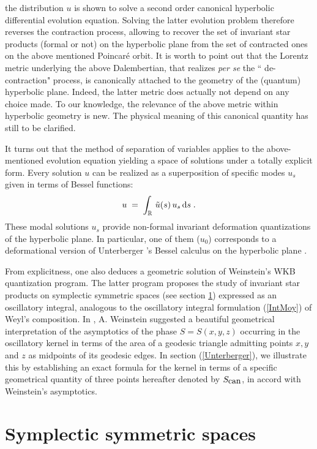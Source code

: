 \documentclass{article}
\newcommand{\R}{\mathbb R}
\def \R{{\mathbb R}}
\begin{document}
the distribution $u$ is shown to solve a second order canonical hyperbolic differential evolution equation.  Solving the latter evolution problem therefore reverses the contraction process, allowing to recover
the set of invariant star products (formal or not) on the hyperbolic plane from the set of contracted ones on the 
above mentioned Poincar\'e orbit. It is worth to point out that the Lorentz metric underlying the above Dalembertian,
that realizes {\sl per  se} the `` de-contraction" process, is canonically attached to the geometry of the (quantum) hyperbolic plane. Indeed, the latter metric does actually not depend on any choice made. To our knowledge,
the relevance of the above metric within hyperbolic geometry is new. The physical meaning of this canonical quantity has still to be clarified.

\noindent It turns out that the method of separation of variables applies to the above-mentioned evolution equation
yielding a space of solutions under a totally explicit form. Every solution $u$ can be realized as 
a superposition of specific modes $u_s$ given in terms of Bessel functions:
\begin{equation*}
u\;=\;\int_\R\,\tilde{u}(s)\,u_s\,{\rm d}s\;.
\end{equation*}
These modal
solutions $u_s$ provide non-formal invariant deformation quantizations of the hyperbolic plane. 
In particular, one of them ($u_0$) corresponds to a deformational version of Unterberger 's Bessel
calculus on the hyperbolic plane \cite{Unt,Unt2}.

\noindent From explicitness, one also deduces a geometric solution of Weinstein's WKB quantization program. 
The latter program proposes the study of  invariant star products on symplectic symmetric spaces
(see section \ref{Symsymspa}) expressed as an oscillatory integral, analogous to the oscillatory integral formulation (\ref{IntMoy}) of Weyl's composition. 
In \cite{WeinsteinTr}, A. Weinstein suggested a beautiful geometrical interpretation of the asymptotics of the phase $S=S(x,y,z)$ occurring in the oscillatory kernel in terms of the  area of a geodesic triangle admitting points
$x,y$ and $z$ as midpoints of its geodesic edges. In section (\ref{Unterberger}), we illustrate this by establishing an exact formula
for the kernel in terms of a specific geometrical quantity of three points hereafter denoted by $S_{\mbox{\rm can}}$,
in accord with Weinstein's asymptotics.

\section{Symplectic symmetric spaces}\label{Symsymspa}
\end{document}
